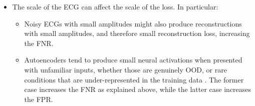 \documentclass[a4paper,10pt]{article}
\begin{document}
\begin{itemize}
	\item The scale of the ECG can affect the scale of the loss. In particular:
	      \begin{itemize}
		      \item Noisy ECGs with small amplitudes might also produce reconstructions with small amplitudes, and therefore small reconstruction loss, increasing the FNR.
		      \item Autoencoders tend to produce small neural activations when presented with unfamiliar inputs, whether those are genuinely OOD, or rare conditions that are under-represented in the training data \cite{rethinking}. The former case increases the FNR as explained above, while the latter case increases the FPR.
	      \end{itemize}
\end{itemize}
\end{document}
